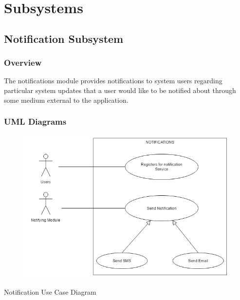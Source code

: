 \documentclass{article}
\begin{document}
    \section{Subsystems}
    
    \subsection{Notification Subsystem}
    
    \subsubsection{Overview}
    
    The notifications module provides notifications to system users regarding
    particular system updates that a user would like to be notified about through
    some medium external to the application.
    
    \subsubsection{UML Diagrams}
    
    \begin{figure}[h!]
        \includegraphics[width=\textwidth]{Notifications_Use_Case.png}
    \end{figure}
    Notification Use Case Diagram
    
    \mbox{}\\
    \bigskip
    \clearpage
    
\end{document}
